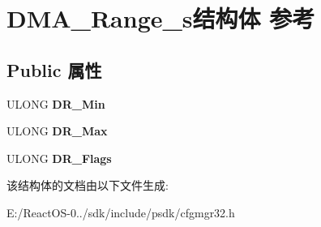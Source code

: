 \hypertarget{struct_d_m_a___range__s}{}\section{D\+M\+A\+\_\+\+Range\+\_\+s结构体 参考}
\label{struct_d_m_a___range__s}
\subsection*{Public 属性}
\begin{DoxyCompactItemize}
\item 
\mbox{\label{struct_d_m_a___range__s_aa863799bd74399e1d006b1734dd53635}} 
U\+L\+O\+NG {\bfseries D\+R\+\_\+\+Min}
\item 
\mbox{\label{struct_d_m_a___range__s_a559988b6781a918e5dc84607f7793bac}} 
U\+L\+O\+NG {\bfseries D\+R\+\_\+\+Max}
\item 
\mbox{\label{struct_d_m_a___range__s_a4e8b54a1e209ea4d3e143a2d19565432}} 
U\+L\+O\+NG {\bfseries D\+R\+\_\+\+Flags}
\end{DoxyCompactItemize}


该结构体的文档由以下文件生成\+:\begin{DoxyCompactItemize}
\item 
E\+:/\+React\+O\+S-\/0../sdk/include/psdk/cfgmgr32.\+h\end{DoxyCompactItemize}
